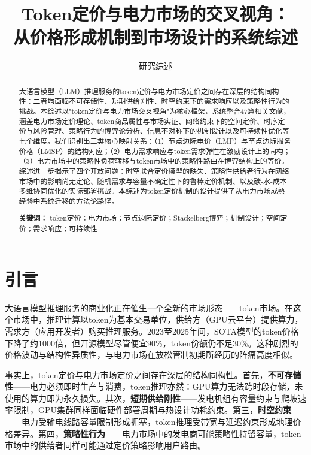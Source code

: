 \documentclass[11pt,twocolumn]{article}
\title{\textbf{Token定价与电力市场的交叉视角：\\从价格形成机制到市场设计的系统综述}}
\author{研究综述}
\date{}
\begin{document}
\maketitle

\begin{abstract}
大语言模型（LLM）推理服务的token定价与电力市场定价之间存在深层的结构同构性：二者均面临不可存储性、短期供给刚性、时空约束下的需求响应以及策略性行为的挑战。本综述以"token定价与电力市场交叉视角"为核心框架，系统整合47篇相关文献，涵盖电力市场定价理论、token商品属性与市场实证、网络约束下的空间定价、时序定价与风险管理、策略行为的博弈论分析、信息不对称下的机制设计以及可持续性优化等七个维度。我们识别出三类核心映射关系：（1）节点边际电价（LMP）与节点边际服务价格（LMSP）的结构对应；（2）电力需求响应与token需求弹性在激励设计上的同构；（3）电力市场中的策略性负荷转移与token市场中的策略性路由在博弈结构上的等价。综述进一步揭示了四个开放问题：时空联合定价模型的缺失、策略性供给者行为在网络市场中的影响尚无定论、随机需求与容量不确定性下的鲁棒定价机制、以及碳-水-成本多维协同优化的实际部署挑战。本综述为token定价机制的设计提供了从电力市场成熟经验中系统迁移的方法论路径。

\textbf{关键词：} token定价；电力市场；节点边际定价；Stackelberg博弈；机制设计；空间定价；需求响应；可持续性
\end{abstract}

\section{引言}

大语言模型推理服务的商业化正在催生一个全新的市场形态——token市场。在这个市场中，推理计算以token为基本交易单位，供给方（GPU云平台）提供算力，需求方（应用开发者）购买推理服务。2023至2025年间，SOTA模型的token价格下降了约1000倍\cite{demirer2025emerging}，但开源模型尽管便宜90\%，token份额仍不足30\%\cite{demirer2025emerging}。这种剧烈的价格波动与结构性异质性，与电力市场在放松管制初期所经历的阵痛高度相似。

事实上，token定价与电力市场定价之间存在深层的结构同构性。首先，\textbf{不可存储性}——电力必须即时生产与消费，token推理亦然：GPU算力无法跨时段存储，未使用的算力即为永久损失。其次，\textbf{短期供给刚性}——发电机组有容量约束与爬坡速率限制，GPU集群同样面临硬件部署周期与热设计功耗约束。第三，\textbf{时空约束}——电力受输电线路容量限制形成拥塞，token推理受带宽与延迟约束形成地理价格差异。第四，\textbf{策略性行为}——电力市场中的发电商可能策略性持留容量\cite{du2021approximating}，token市场中的供给者同样可能通过定价策略影响用户路由\cite{guo2025prilm}。
\end{document}
